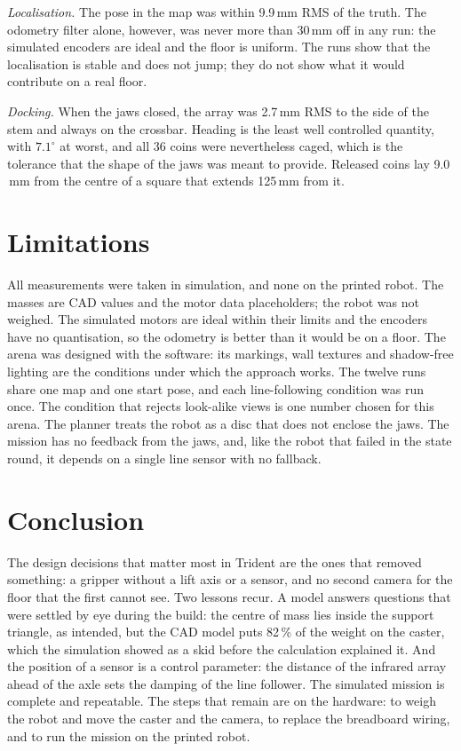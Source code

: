 \documentclass[conference,a4paper]{IEEEtran}
\newcommand{\unit}[1]{\ensuremath{\,\mathrm{#1}}}
\begin{document}
\emph{Localisation.} The pose in the map was within 9.9\unit{mm} RMS of the truth. The
odometry filter alone, however, was never more than 30\unit{mm} off in any run: the
simulated encoders are ideal and the floor is uniform. The runs show that the localisation
is stable and does not jump; they do not show what it would contribute on a real floor.

\emph{Docking.} When the jaws closed, the array was 2.7\unit{mm} RMS to the side of the
stem and always on the crossbar. Heading is the least well controlled quantity, with
$7.1^\circ$ at worst, and all 36 coins were nevertheless caged, which is the tolerance that
the shape of the jaws was meant to provide. Released coins lay 9.0\unit{mm} from the centre
of a square that extends 125\unit{mm} from it.

\section{Limitations}
All measurements were taken in simulation, and none on the printed robot. The masses are
CAD values and the motor data placeholders; the robot was not weighed. The simulated motors
are ideal within their limits and the encoders have no quantisation, so the odometry is
better than it would be on a floor. The arena was designed with the software: its markings,
wall textures and shadow-free lighting are the conditions under which the approach works.
The twelve runs share one map and one start pose, and each line-following condition was run
once. The condition that rejects look-alike views is one number chosen for this arena. The
planner treats the robot as a disc that does not enclose the jaws. The mission has no
feedback from the jaws, and, like the robot that failed in the state round, it depends on a
single line sensor with no fallback.

\section{Conclusion}
The design decisions that matter most in Trident are the ones that removed something: a
gripper without a lift axis or a sensor, and no second camera for the floor that the first
cannot see. Two lessons recur. A model answers questions that were settled by eye during
the build: the centre of mass lies inside the support triangle, as intended, but the CAD
model puts 82\,\% of the weight on the caster, which the simulation showed as a skid before the
calculation explained it. And the position of a sensor is a control parameter: the distance
of the infrared array ahead of the axle sets the damping of the line follower. The
simulated mission is complete and repeatable. The steps that remain are on the hardware: to
weigh the robot and move the caster and the camera, to replace the breadboard wiring, and to
run the mission on the printed robot.

\balance


\end{document}
